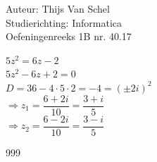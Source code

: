 \documentclass[a4paper]{article}
\begin{document}
  
\noindent \large Auteur: Thijs Van Schel \\
\noindent \large Studierichting: Informatica\\
\noindent \large Oefeningenreeks 1B nr. 40.17\\

\medskip

\normalsize

$5z^2 = 6z-2$\\

$5z^2 - 6z + 2 = 0$\\

$D = 36 - 4 \cdot 5 \cdot 2 = -4 = (\pm2i)^2$\\

$\Rightarrow z_1 = \dfrac{6 + 2i}{10} = \dfrac{3 + i}{5}$\\

$\Rightarrow z_2 = \dfrac{6 - 2i}{10} = \dfrac{3 - i}{5}$\\

\begin{thebibliography}{999}
\end{thebibliography}
\end{document}

